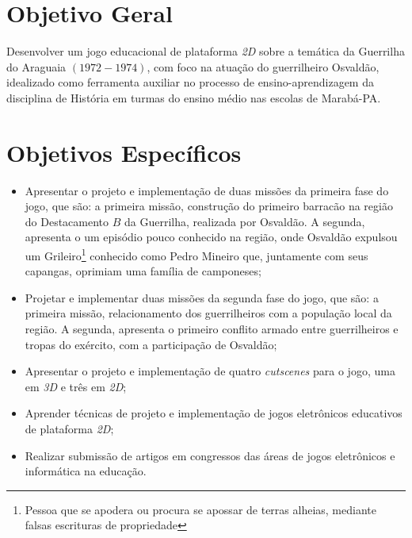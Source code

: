 \section{Objetivo Geral}
\label{sec:objetivogeral}

Desenvolver um jogo educacional de plataforma \textit{2D} sobre a temática da Guerrilha do Araguaia $(1972-1974)$, com foco na atuação do guerrilheiro Osvaldão, idealizado como ferramenta auxiliar no processo de ensino-aprendizagem da disciplina de História em turmas do ensino médio nas escolas de Marabá-PA.

\section{Objetivos Específicos}
\label{sec:objetivosespecificos}

\begin{itemize}
		
	\item Apresentar o projeto e implementação de duas missões da primeira fase do jogo, que são: a primeira missão, construção do primeiro barracão na região do Destacamento $B$ da Guerrilha, realizada por Osvaldão. A segunda, apresenta o um episódio pouco conhecido na região, onde Osvaldão expulsou um Grileiro\footnote{Pessoa que se apodera ou procura se apossar de terras alheias, mediante falsas escrituras de propriedade} conhecido como Pedro Mineiro que, juntamente com seus capangas, oprimiam uma família de camponeses;
			
	\item Projetar e implementar duas missões da segunda fase do jogo, que são: a primeira missão, relacionamento dos guerrilheiros com a população local da região. A segunda, apresenta o primeiro conflito armado entre guerrilheiros e tropas do exército, com a participação de Osvaldão;
	
	\item Apresentar o projeto e implementação de quatro \textit{cutscenes} para o jogo, uma em \textit{3D} e três em \textit{2D};
				
	\item Aprender técnicas de projeto e implementação de jogos eletrônicos educativos de plataforma \textit{2D};
	
	\item Realizar submissão de artigos em congressos das áreas de jogos eletrônicos e informática na educação.
	
\end{itemize}

